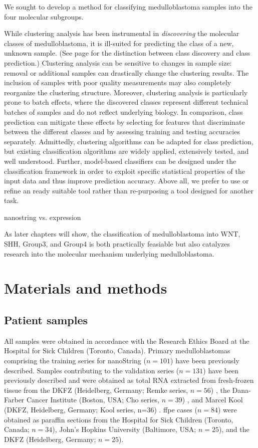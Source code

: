 We sought to develop a method for classifying medulloblastoma samples into the four molecular subgroups.

While clustering analysis has been instrumental in \emph{discovering} the molecular classes of medulloblastoma, it is ill-suited for predicting the class of a new, unknown sample. (See page \pageref{sec:classification} for the distinction between class discovery and class prediction.)  Clustering analysis can be sensitive to changes in sample size: removal or additional samples can drastically change the clustering results. The inclusion of samples with poor quality measurements may also completely reorganize the clustering structure. Moreover, clustering analysis is particularly prone to batch effects, where the discovered classes represent different technical batches of samples and do not reflect underlying biology. In comparison, class prediction can mitigate these effects by selecting for features that discriminate between the different classes and by assessing training and testing accuracies separately. Admittedly, clustering algorithms can be adapted for class prediction, but existing classification algorithms are widely applied, extensively tested, and well understood. Further, model-based classifiers can be designed under the classification framework in order to exploit specific statistical properties of the input data and thus improve prediction accuracy. Above all, we prefer to use or refine an ready suitable tool rather than re-purposing a tool designed for another task.



nanostring vs. expression

As later chapters will show, the classification of medulloblastoma into WNT, SHH, Group3, and Group4 is both practically feasiable but also catalyzes research into the molecular mechanism underlying medulloblastoma.


\section{Materials and methods}

\subsection{Patient samples}

All samples were obtained in accordance with the Research Ethics Board at the Hospital for Sick Children (Toronto, Canada).  Primary medulloblastomas comprising the training series for nanoString ($n = 101$) have been previously described.  Samples contributing to the validation series ($n = 131$) have been previously described and were obtained as total RNA extracted from fresh-frozen tissue from the DKFZ (Heidelberg, Germany; Remke series, $n = 56$) , the Dana-Farber Cancer Institute (Boston, USA; Cho series, $n = 39$) , and Marcel Kool (DKFZ, Heidelberg, Germany; Kool series, n=36) .  \gls{ffpe} cases ($n = 84$) were obtained as paraffin sections from the Hospital for Sick Children (Toronto, Canada; $n = 34$), John’s Hopkins University (Baltimore, USA; $n = 25$), and the DKFZ (Heidelberg, Germany; $n = 25$).

